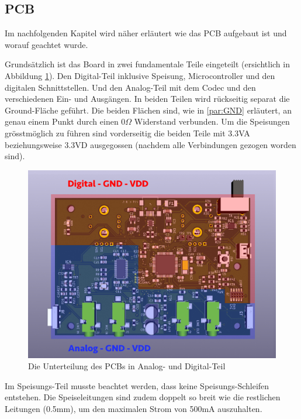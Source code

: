 \subsection{PCB}
\label{sec:PCB}

Im nachfolgenden Kapitel wird näher erläutert wie das PCB aufgebaut ist und worauf geachtet wurde.

Grundsätzlich ist das Board in zwei fundamentale Teile eingeteilt (ersichtlich in Abbildung \ref{fig:PCB_GNDVDD}).  Den Digital-Teil inklusive Speisung, Microcontroller und den digitalen Schnittstellen. Und den Analog-Teil mit dem Codec und den verschiedenen Ein- und Ausgängen. In beiden Teilen wird rückseitig separat die Ground-Fläche geführt. Die beiden Flächen sind, wie in \ref{par:GND} erläutert, an genau einem Punkt durch einen $0\Omega$ Widerstand verbunden. Um die Speisungen grösstmöglich zu führen sind vorderseitig die beiden Teile mit 3.3VA beziehungsweise 3.3VD ausgegossen (nachdem alle Verbindungen gezogen worden sind).

\begin{figure} [H]
\begin{center}
 \includegraphics[scale=0.37]{../graphics/PCB-Layout_GNDVDD.jpg}
 \caption{Die Unterteilung des PCBs in Analog- und Digital-Teil}
\label{fig:PCB_GNDVDD}
\end{center}
\end{figure}

Im Speisungs-Teil musste beachtet werden, dass keine Speisungs-Schleifen entstehen. Die  Speiseleitungen sind zudem doppelt so breit wie die restlichen Leitungen (0.5mm), um den maximalen Strom von 500mA auszuhalten.

